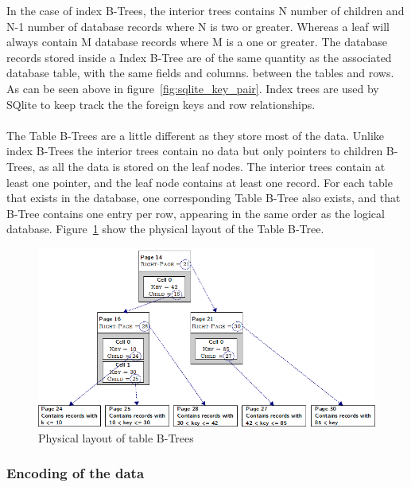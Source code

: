 In the case of index B-Trees, the interior trees contains N number of children and N-1 number of database records where N is two or greater. Whereas a leaf will always contain M database records where M is a one or greater. The database records stored inside a Index B-Tree are of the same quantity as the associated database table, with the same fields and columns. between the tables and rows. As can be seen above in figure~\ref{fig:sqlite_key_pair}. Index trees are used by SQlite to keep track the the foreign keys and row relationships.
\\\\
The Table B-Trees are a little different as they store most of the data. Unlike index B-Trees the interior trees contain no data but only pointers to children B-Trees, as all the data is stored on the leaf nodes. The interior trees contain at least one pointer, and the leaf node contains at least one record. For each table that exists in the database, one corresponding Table B-Tree also exists, and that B-Tree contains one entry per row, appearing in the same order as the logical database. Figure~\ref{fig:sqlite_table_btree} show the physical layout of the Table B-Tree. 
\begin{figure}[H]
	\centering
	\includegraphics[scale=0.5]{images/sqlite_table_btree.png}
	\caption{Physical layout of table B-Trees \citep{chibd}}
	\label{fig:sqlite_table_btree}
\end{figure}

\subsubsection{Encoding of the data}
\label{subsubsec:sqlite_data_encoding}

